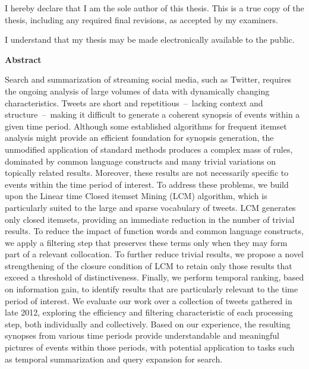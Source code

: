\cleardoublepage %
 


  \noindent
I hereby declare that I am the sole author of this thesis. This is a true copy of the thesis, including any required final revisions, as accepted by my examiners.

  \bigskip
  
  \noindent
I understand that my thesis may be made electronically available to the public.

\cleardoublepage


\begin{center}\textbf{Abstract}\end{center}
Search and summarization of streaming social media, such as Twitter, requires the ongoing analysis of large volumes of data with dynamically changing characteristics.  Tweets are short and repetitious~--~lacking context and structure~--~making it difficult to generate a coherent synopsis of events within a given time period.  Although some established algorithms for frequent itemset analysis might provide an efficient foundation for synopsis generation, the unmodified application of standard methods produces a complex mass of rules, dominated by common language constructs and many trivial variations on topically related results.  Moreover, these results are not necessarily specific to events within the time period of interest.  To address these problems, we build upon the Linear time Closed itemset Mining (LCM) algorithm, which is particularly suited to the large and sparse vocabulary of tweets.  LCM generates only closed itemsets, providing an immediate reduction in the number of trivial results.  To reduce the impact of function words and common language constructs, we apply a filtering step that preserves these terms only when they may form part of a relevant collocation.  To further reduce trivial results, we propose a novel strengthening of the closure condition of LCM to retain only those results that exceed a threshold of distinctiveness.  Finally, we perform temporal ranking, based on information gain, to identify results that are particularly relevant to the time period of interest.  We evaluate our work over a collection of tweets gathered in late 2012, exploring the efficiency and filtering characteristic of each processing step, both individually and collectively.  Based on our experience, the resulting synopses from various time periods provide understandable and meaningful pictures of events within those periods, with potential application to tasks such as temporal summarization and query expansion for search.

